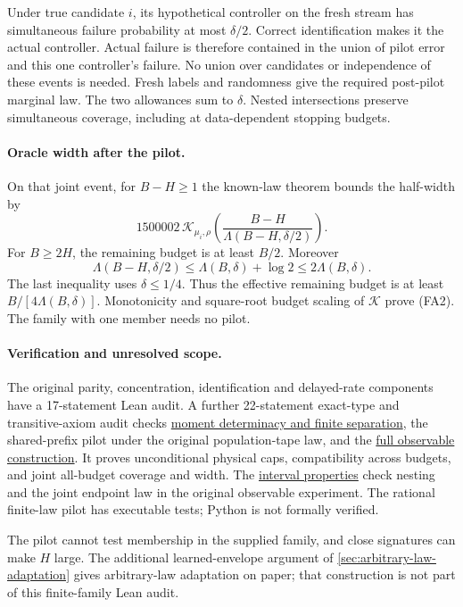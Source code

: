 Under true candidate $i$, its hypothetical controller on the fresh stream
has simultaneous failure probability at most $\delta/2$. Correct
identification makes it the actual controller. Actual failure is therefore
contained in the union of pilot error and this one controller's failure.
No union over candidates or independence of these events is needed.
Fresh labels and randomness give the required post-pilot marginal law.
The two allowances sum to $\delta$. Nested intersections preserve
simultaneous coverage, including at data-dependent stopping budgets.

\paragraph{Oracle width after the pilot.}
On that joint event, for $B-H\ge1$ the known-law theorem bounds the
half-width by
\[
 1500002\,\mathcal K_{\mu_i,\rho}
 \!\left(\frac{B-H}{\Lambda(B-H,\delta/2)}\right).
\]
For $B\ge2H$, the remaining budget is at least $B/2$. Moreover
\[
 \Lambda(B-H,\delta/2)\le\Lambda(B,\delta)+\log2
                    \le2\Lambda(B,\delta).
\]
The last inequality uses $\delta\le1/4$.
Thus the effective remaining budget is at least
$B/[4\Lambda(B,\delta)]$. Monotonicity and square-root budget scaling of
$\mathcal K$ prove (FA2). The family with one member needs no pilot.

\paragraph{Verification and unresolved scope.}
The original parity, concentration, identification and delayed-rate components
have a 17-statement Lean audit. A further 22-statement exact-type and
transitive-axiom audit checks
\href{https://github.com/davidiach/adaptive-threshold-estimation/blob/b18f73fc0120b0b68b45b31e5aad08c943867fde/lean/ThresholdHC/LawAdaptation/Moments.lean}{moment determinacy and finite separation},
the shared-prefix pilot under the original population-tape law, and the
\href{https://github.com/davidiach/adaptive-threshold-estimation/blob/b18f73fc0120b0b68b45b31e5aad08c943867fde/lean/ThresholdHC/LawAdaptation/Full.lean}{full observable construction}.
It proves unconditional physical caps, compatibility across budgets, and joint
all-budget coverage and width. The
\href{https://github.com/davidiach/adaptive-threshold-estimation/blob/b18f73fc0120b0b68b45b31e5aad08c943867fde/lean/ThresholdHC/LawAdaptation/Properties.lean}{interval properties}
check nesting and the joint endpoint law in the original observable experiment.
The rational finite-law pilot has executable tests; Python is not formally verified.

The pilot cannot test membership in the supplied family, and close
signatures can make $H$ large. The additional learned-envelope argument
of \cref{sec:arbitrary-law-adaptation} gives arbitrary-law adaptation
on paper; that construction is not part of this finite-family Lean audit.


